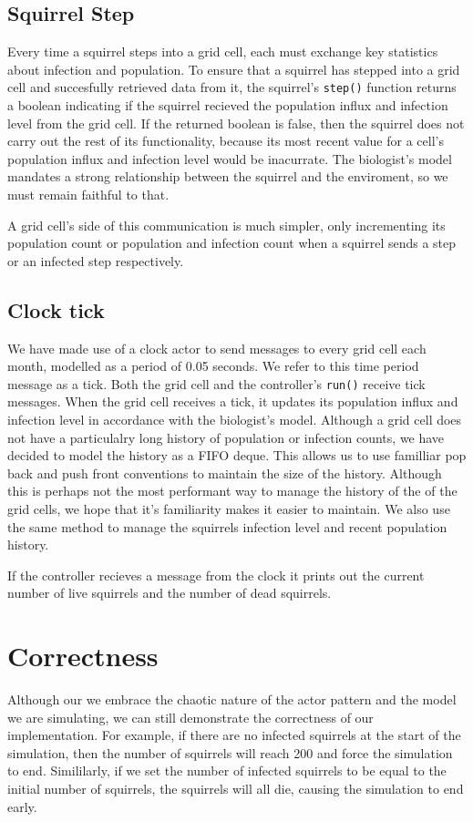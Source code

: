 \documentclass[oneside]{article}
\begin{document}
\subsection{Squirrel Step}
Every time a squirrel steps into a grid cell, each must exchange key statistics about infection and population. To ensure that a squirrel has stepped into a grid cell and succesfully retrieved data from it, the squirrel's \texttt{step()} function returns a boolean indicating if the squirrel recieved the population influx and infection level from the grid cell. If the returned boolean is false, then the squirrel does not carry out the rest of its functionality, because its most recent value for a cell's population influx and infection level would be inacurrate. The biologist's model mandates a strong relationship between the squirrel and the enviroment, so we must remain faithful to that.

A grid cell's side of this communication is much simpler, only incrementing its population count or population and infection count when a squirrel sends a step or an infected step respectively.
\subsection{Clock tick}
We have made use of a clock actor to send messages to every grid cell each month, modelled as a period of 0.05 seconds. We refer to this time period message as a tick. Both the grid cell and the controller's \texttt{run()} receive tick messages. When the grid cell receives a tick, it updates its population influx and infection level in accordance with the biologist's model. Although a grid cell does not have a particulalry long history of population or infection counts, we have decided to model the history as a FIFO deque. This allows us to use familliar pop back and push front conventions to maintain the size of the history. Although this is perhaps not the most performant way to manage the history of the of the grid cells, we hope that it's familiarity makes it easier to maintain. We also use the same method to manage the squirrels infection level and recent population history.

If the controller recieves a message from the clock it prints out the current number of live squirrels and the number of dead squirrels.

\section{Correctness}\label{sec:cor}
Although our we embrace the chaotic nature of the actor pattern and the model we are simulating, we can still demonstrate the correctness of our implementation. For example, if there are no infected squirrels at the start of the simulation, then the number of squirrels will reach 200 and force the simulation to end. Simililarly, if we set the number of infected squirrels to be equal to the initial number of squirrels, the squirrels will all die, causing the simulation to end early.
\end{document}
